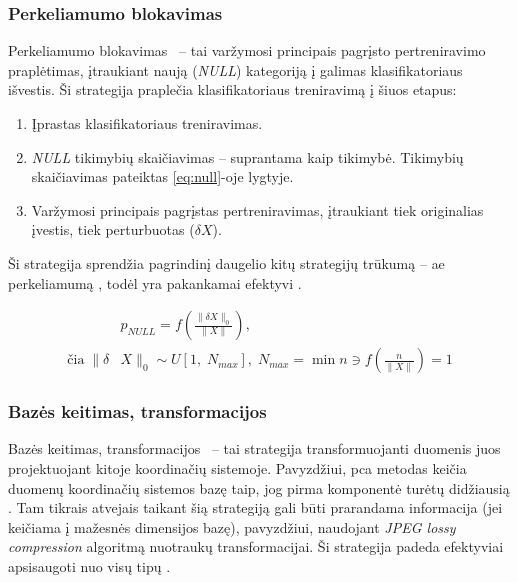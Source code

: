 \def\strat{Perkeliamumo blokavimas}
\subsubsection{\strat}\label{sec:literature:defense:blocking}

\strat~ -- tai varžymosi principais pagrįsto pertreniravimo  praplėtimas, įtraukiant naują (\textit{NULL}) kategoriją į galimas klasifikatoriaus išvestis. Ši strategija praplečia klasifikatoriaus treniravimą į šiuos etapus:
\begin{enumerate}
    \item Įprastas klasifikatoriaus treniravimas.
    \item \textit{NULL} tikimybių skaičiavimas -- suprantama kaip  tikimybė. Tikimybių skaičiavimas pateiktas \ref{eq:null}-oje lygtyje.
    \item Varžymosi principais pagrįstas pertreniravimas, įtraukiant tiek originalias įvestis, tiek perturbuotas ($\delta X$).
\end{enumerate}

Ši strategija sprendžia pagrindinį daugelio kitų strategijų trūkumą -- \gls{ae} perkeliamumą , todėl yra pakankamai efektyvi \cite{chakrabortySurveyAdversarialAttacks2021}.

\begin{equation}\label{eq:null}
    \begin{split}
        &p_{NULL} = f\left(\frac{\| \delta X \|_0}{\|X\|}\right),\\
        \text{čia}\; \| \delta
        &X \|_0 \sim U[1,\; N_{max}], \; N_{max} = \min n \ni f\left(\frac{n}{\|X\|}\right)
        = 1
    \end{split}
\end{equation}



\def\strat{Bazės keitimas, transformacijos}
\subsubsection{\strat}\label{sec:literature:defense:basis}

\strat~ -- tai strategija transformuojanti duomenis juos projektuojant kitoje koordinačių sistemoje. Pavyzdžiui, \gls{pca} metodas keičia duomenų koordinačių sistemos bazę taip, jog pirma komponentė turėtų didžiausią . Tam tikrais atvejais taikant šią strategiją gali būti prarandama informacija (jei keičiama į mažesnės dimensijos bazę), pavyzdžiui, naudojant \textit{JPEG lossy compression} algoritmą nuotraukų transformacijai. Ši strategija padeda efektyviai apsisaugoti nuo visų tipų  \cite{chakrabortySurveyAdversarialAttacks2021}.